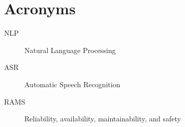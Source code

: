 
\chapter{Acronyms}
\begin{description}
\item[NLP] Natural Language Processing
\item[ASR] Automatic Speech Recognition
\item[RAMS] Reliability, availability, maintainability, and safety
\end{description}